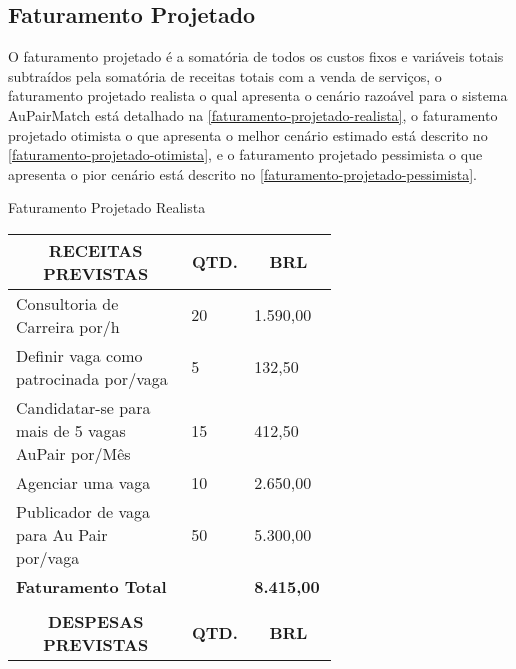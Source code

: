 \subsection{Faturamento Projetado}

O faturamento projetado é a somatória de todos os custos fixos e variáveis totais subtraídos pela somatória de receitas totais com a venda de serviços, o faturamento projetado realista o qual apresenta o cenário razoável para o sistema AuPairMatch está detalhado na \autoref{faturamento-projetado-realista}, o faturamento projetado otimista o que apresenta o melhor cenário estimado está descrito no \autoref{faturamento-projetado-otimista}, e o faturamento projetado pessimista o que apresenta o pior cenário está descrito no \autoref{faturamento-projetado-pessimista}.

\begin{enumerate}
    \begin{quadro}[H]
    \caption{Faturamento Projetado Realista}
    \label{faturamento-projetado-realista}
    	\centering\footnotesize
        \begin{tabular}{|p{0.50\linewidth} | p{0.04\linewidth} |  p{0.10\linewidth} |}  \hline

        \multicolumn{1}{|c|}{\textbf{RECEITAS PREVISTAS}} &
        \multicolumn{1}{|c|}{\textbf{QTD.}} &
        \multicolumn{1}{|c|}{\textbf{BRL}} \\ \hline


    Consultoria de Carreira por/h   & 20 & 1.590,00         \\ \hline
    Definir vaga como patrocinada por/vaga  & 5 & 132,50      \\ \hline
    Candidatar-se para mais de 5 vagas AuPair por/Mês     &  15 & 412,50     \\ \hline
    Agenciar uma vaga             &  10  & 2.650,00          \\ \hline
    Publicador de vaga para Au Pair por/vaga     & 50  &   5.300,00     \\ \hline
    {\textbf{Faturamento Total}}   &   &   {\textbf{8.415,00}}           \\  \hline 


    &   &        \\ \hline
    \multicolumn{1}{|c|}{\textbf{DESPESAS PREVISTAS}} &
    \multicolumn{1}{|c|}{\textbf{QTD.}} &
    \multicolumn{1}{|c|}{\textbf{BRL}} \\ \hline


\end{tabular}
\end{quadro}
\end{enumerate}
